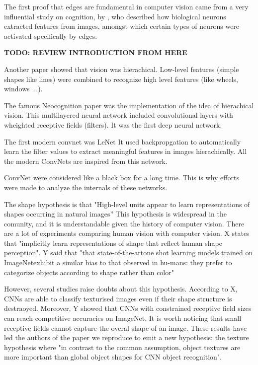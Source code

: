 \documentclass{article}
\begin{document}
\noindent
The first proof that edges are fundamental in computer vision came from a very influential study on cognition, 
by \cite{hubel1959receptive}, who described how biological neurons extracted features from images,
amongst which certain types of neurons were activated specifically by edges. \smallskip


\textbf{TODO: REVIEW INTRODUCTION FROM HERE}

\noindent
Another paper showed that vision was hierachical. Low-level features (simple shapes like lines)
were combined to recognize high level features (like wheels, windows ...).

The famous Neocognition paper was the implementation of the idea of hierachical vision.
This multilayered neural network included convolutional layers with wheighted receptive fields (filters).
It was the first deep neural network.

The first modern convnet was LeNet \cite{Lecun98gradient-basedlearning}
It used backpropgation to automatically learn the filter values to extract meaningful features in images hierachically.
All the modern ConvNets are inspired from this network.

ConvNet were considered like a black box for a long time.
This is why efforts were made to analyze the internals of these networks.

The shape hypothesis is that "High-level units appear to learn
representations of shapes occurring in natural images” \cite{Kriegeskorte029876}
This hypothesis is widespread in the comunity, and
it is understandable given the history of computer vision.
There are a lot of experiments comparing human vision with computer vision.
X states that "implicitly learn representations of shape
 that reflect human shape perception".
Y said that "that  state-of-the-artone  shot  learning  models  trained  on  ImageNetexhibit  a  similar  bias  to  that  observed  in  hu-mans:  
they prefer to categorize objects according  to  shape  rather  than  color" \cite{ritter2017cognitive}

However, several studies raise doubts about this hypothesis.
According to X, CNNs are able to classify texturised images even if their shape structure is destraoyed.
Moreover, Y showed that CNNs with constrained receptive field sizes can reach competitive accuracies on ImageNet.
It is worth noticing that small receptive fields cannot capture the overal shape of an image.
These results have led the authors of the paper we reproduce \cite{geirhos2018imagenettrained} 
to emit a new hypothesis: the texture hypothesis where "in contrast to the
common assumption, object textures are more important than global object shapes for CNN object
recognition".
\end{document}

